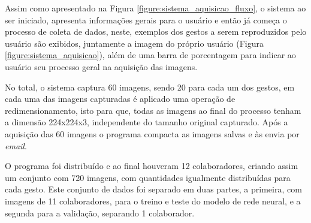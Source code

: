 
\par Assim como apresentado na Figura \ref{figure:sistema_aquisicao_fluxo}, o sistema ao ser iniciado, apresenta informações gerais para o usuário e então já começa o processo de coleta de dados, neste, exemplos dos gestos a serem reproduzidos pelo usuário são exibidos, juntamente a imagem do próprio usuário (Figura \ref{figure:sistema_aquisicao}), além de uma barra de porcentagem para indicar ao usuário seu processo geral na aquisição das imagens.


\par No total, o sistema captura 60 imagens, sendo 20 para cada um dos gestos, em cada uma das imagens capturadas é aplicado uma operação de redimensionamento, isto para que, todas as imagens ao final do processo tenham a dimensão 224x224x3, independente do tamanho original capturado. Após a aquisição das 60 imagens o programa compacta as imagens salvas e às envia por \textit{email}.




\par O programa foi distribuído e ao final houveram 12 colaboradores, criando assim um conjunto com 720 imagens, com quantidades igualmente distribuídas para cada gesto. Este conjunto de dados foi separado em duas partes, a primeira, com imagens de 11 colaboradores, para o treino e teste do modelo de rede neural, e a segunda para a validação, separando 1 colaborador.

